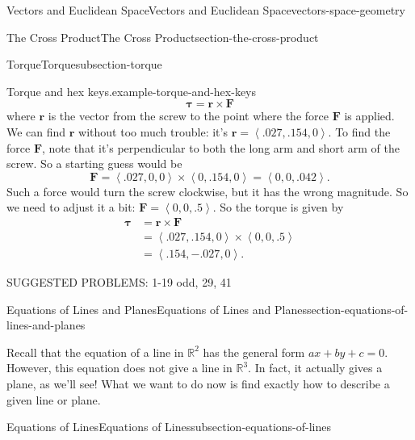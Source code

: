 \documentclass[oneside,10pt,]{book}
\numberwithin{equation}{section}
\newcommand{\RR}{\mathbb{R}}
\newcommand{\vv}[1]{\mathbf{#1}}
\newcommand{\dotprod}[1]{\left\langle #1 \right\rangle}
\begin{document}
\begin{chapterptx}{Vectors and Euclidean Space}{}{Vectors and Euclidean Space}{}{}{vectors-space-geometry}
\begin{sectionptx}{The Cross Product}{}{The Cross Product}{}{}{section-the-cross-product}
\begin{subsectionptx}{Torque}{}{Torque}{}{}{subsection-torque}
\begin{example}{Torque and hex keys.}{example-torque-and-hex-keys}
%
\begin{equation*}
\boldsymbol{\tau} = \vv{r}\times\vv{F}
\end{equation*}
\hypertarget{p-1196}{}%
where \(\vv{r}\) is the vector from the screw to the point where the force \(\vv{F}\) is applied. We can find \(\vv{r}\) without too much trouble: it's \(\vv{r} = \dotprod{.027,.154,0}\). To find the force \(\vv{F}\), note that it's perpendicular to both the long arm and short arm of the screw. So a starting guess would be%
%
\begin{equation*}
\vv{F} = \dotprod{.027,0,0}\times\dotprod{0,.154,0} = \dotprod{0,0,.042}.
\end{equation*}
\hypertarget{p-1197}{}%
Such a force would turn the screw clockwise, but it has the wrong magnitude. So we need to adjust it a bit: \(\vv{F} = \dotprod{0,0,.5}\). So the torque is given by%
%
\begin{align*}
\mathbf{\tau} &= \vv{r}\times\vv{F} \\
& = \dotprod{.027,.154,0}\times\dotprod{0,0,.5} \\
& = \dotprod{.154,-.027,0}. 
\end{align*}
\end{example}
\end{subsectionptx}
\begin{conclusion}{}%
\hypertarget{p-1198}{}%
SUGGESTED PROBLEMS: 1-19 odd, 29, 41%
\end{conclusion}%
\end{sectionptx}
%
%
\typeout{************************************************}
\typeout{************************************************}
%
\begin{sectionptx}{Equations of Lines and Planes}{}{Equations of Lines and Planes}{}{}{section-equations-of-lines-and-planes}
\begin{introduction}{}%
\hypertarget{p-1199}{}%
Recall that the equation of a line in \(\RR^{2}\) has the general form \(ax+by + c = 0\). However, this equation does not give a line in \(\RR^{3}\). In fact, it actually gives a plane, as we'll see! What we want to do now is find exactly how to describe a given line or plane.%
\end{introduction}%
%
%
\typeout{************************************************}
\typeout{************************************************}
%
\begin{subsectionptx}{Equations of Lines}{}{Equations of Lines}{}{}{subsection-equations-of-lines}

\end{subsectionptx}
\end{sectionptx}
\end{chapterptx}
\end{document}

